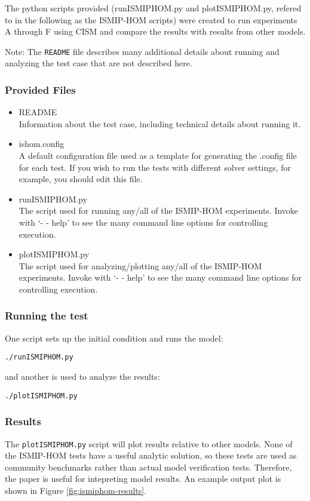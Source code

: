 The python scripts provided (runISMIPHOM.py and plotISMIPHOM.py, refered to in the following as the ISMIP-HOM 
scripts) were created to run experiments A through F using CISM and compare the results with results from other models. 

Note: The \texttt{README} file describes many additional details about running and analyzing the
test case that are not described here.

\subsubsection{Provided Files}

\begin{itemize}
	\item README \\
		Information about the test case, including technical details about running it.
	\item ishom.config \\
		A default configuration file used as a template for generating the .config file for each test.
    		If you wish to run the tests with different solver settings, for example, you should edit this file.
	\item runISMIPHOM.py \\
		The script used for running any/all of the ISMIP-HOM experiments.  
    		Invoke with `- - help' to see the many command line options for controlling execution.
  \item plotISMIPHOM.py \\
		The script used for analyzing/plotting any/all of the ISMIP-HOM experiments.  
    		Invoke with `- - help' to see the many command line options for controlling execution.
\end{itemize}

\subsubsection{Running the test}
One script sets up the initial condition and runs the model:

\texttt{./runISMIPHOM.py}

and another is used to analyze the results:

\texttt{./plotISMIPHOM.py}

\subsubsection{Results}
The \texttt{plotISMIPHOM.py} script will plot results relative to other models.
None of the ISMIP-HOM tests have a useful analytic solution, so these tests are
used as community benchmarks rather than actual model verification tests.
Therefore, the \citet{Pattyn2008} paper is useful for intepreting model results.
An example output plot is shown in Figure \ref{fig:ismiphom-results}.

